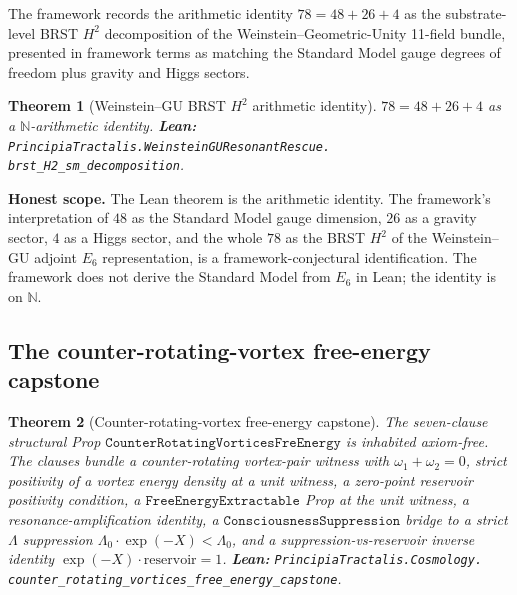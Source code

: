 \documentclass[11pt,a4paper]{article}
\theoremstyle{plain}
\newtheorem{theorem}{Theorem}[section]
\theoremstyle{definition}
\begin{document}
The framework records the arithmetic identity $78 = 48 + 26 + 4$ as
the substrate-level BRST $H^{2}$ decomposition of the
Weinstein--Geometric-Unity 11-field bundle, presented in framework
terms as matching the Standard Model gauge degrees of freedom plus
gravity and Higgs sectors.

\begin{theorem}[Weinstein--GU BRST $H^{2}$ arithmetic identity]
\label{thm:brst-h2}
$78 = 48 + 26 + 4$ as a $\mathbb{N}$-arithmetic identity.
\textbf{Lean:}
\texttt{PrincipiaTractalis.WeinsteinGUResonantRescue.\\
brst\_H2\_sm\_decomposition}.
\end{theorem}

\noindent\textbf{Honest scope.} The Lean theorem is the arithmetic
identity. The framework's interpretation of $48$ as the Standard
Model gauge dimension, $26$ as a gravity sector, $4$ as a Higgs
sector, and the whole $78$ as the BRST $H^{2}$ of the Weinstein--GU
adjoint $E_{6}$ representation, is a framework-conjectural
identification. The framework does not derive the Standard Model from
$E_{6}$ in Lean; the identity is on $\mathbb{N}$.

\subsection{The counter-rotating-vortex free-energy capstone}
\label{sec:counter-rotating-capstone}

\begin{theorem}[Counter-rotating-vortex free-energy capstone]
\label{thm:counter-rotating}
The seven-clause structural Prop
$\mathtt{CounterRotatingVorticesFreEnergy}$ is inhabited axiom-free.
The clauses bundle a counter-rotating vortex-pair witness with
$\omega_{1} + \omega_{2} = 0$, strict positivity of a vortex energy
density at a unit witness, a zero-point reservoir positivity
condition, a $\mathtt{FreeEnergyExtractable}$ Prop at the unit
witness, a resonance-amplification identity, a
$\mathtt{ConsciousnessSuppression}$ bridge to a strict
$\Lambda$ suppression $\Lambda_{0} \cdot \exp(-X) < \Lambda_{0}$, and
a suppression-vs-reservoir inverse identity
$\exp(-X) \cdot \text{reservoir} = 1$.
\textbf{Lean:}
\texttt{PrincipiaTractalis.Cosmology.\\
counter\_rotating\_vortices\_free\_energy\_capstone}.
\end{theorem}
\end{document}

